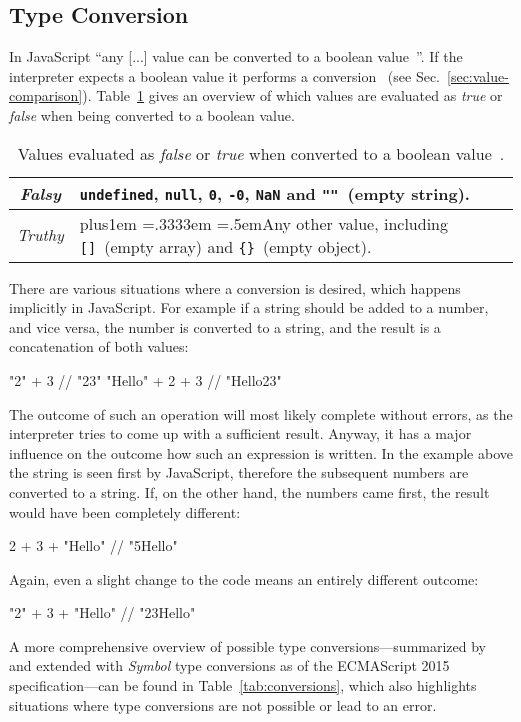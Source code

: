 \subsection{Type Conversion}
\label{sec:type-conversion}

In JavaScript ``any [...] value can be converted to a boolean value~\cite[p.~40]{JavaScriptTheDefinitiveGuide:Flanagan:2011}''. If the interpreter expects a boolean value it performs a conversion~\cite[p.~46]{JavaScriptTheDefinitiveGuide:Flanagan:2011} (see Sec.~\ref{sec:value-comparison}). Table~\ref{tab:truthy-falsy} gives an overview of which values are evaluated as \emph{true} or \emph{false} when being converted to a boolean value.
\begin{table}
\caption{Values evaluated as \emph{false} or \emph{true} when converted to a boolean value~\cite[p.~40]{JavaScriptTheDefinitiveGuide:Flanagan:2011}.}\label{tab:truthy-falsy}
\centering
  \def\rr{\rightskip=0pt plus1em \spaceskip=.3333em \xspaceskip=.5em\relax}
  \setlength{\tabcolsep}{1ex}
  \def\arraystretch{1.20}
  \setlength{\tabcolsep}{1ex}
  \small
  \begin{tabular}{|c||l|}
    \hline
    \emph{Falsy} & \texttt{undefined}, \texttt{null}, \texttt{0}, \texttt{-0}, \texttt{NaN} and \texttt{""}~(empty string). \\
    \hline
    \emph{Truthy} & {\rr Any other value, including \texttt{[]}~(empty array) and \texttt{\{\}}~(empty object). } \\
    \hline
  \end{tabular}
\end{table}
There are various situations where a conversion is desired, which happens implicitly in JavaScript. For example if a string should be added to a number, and vice versa, the number is converted to a string, and the result is a concatenation of both values:
\begin{JsCode}[numbers=none]
"2" + 3 // "23"
"Hello" + 2 + 3 // "Hello23"
\end{JsCode}
The outcome of such an operation will most likely complete without errors, as the interpreter tries to come up with a sufficient result. Anyway, it has a major influence on the outcome how such an expression is written. In the example above the string is seen first by JavaScript, therefore the subsequent numbers are converted to a string. If, on the other hand, the numbers came first, the result would have been completely different:
\begin{JsCode}[numbers=none]
2 + 3 + "Hello" // "5Hello"
\end{JsCode}
Again, even a slight change to the code means an entirely different outcome:
\begin{JsCode}[numbers=none]
"2" + 3 + "Hello" // "23Hello"
\end{JsCode}
A more comprehensive overview of possible type conversions---summarized by \citeauthor{JavaScriptTheDefinitiveGuide:Flanagan:2011} and extended with \emph{Symbol} type conversions as of the ECMAScript 2015 specification---can be found in Table~\ref{tab:conversions}, which also highlights situations where type conversions are not possible or lead to an error.

